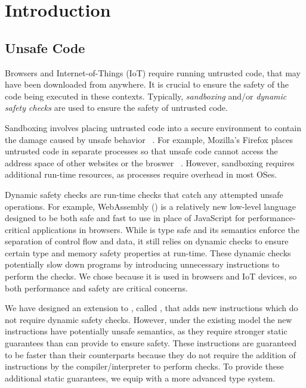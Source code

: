 \chapter{Introduction}
\label{chp:intro}

\section{Unsafe Code}
Browsers and Internet-of-Things (IoT) require running untrusted code, that may have been downloaded from anywhere.
It is crucial to ensure the safety of the code being executed in these contexts.
Typically, \emph{sandboxing} and/or \emph{dynamic safety checks} are used to ensure the safety of untrusted code.

Sandboxing involves placing untrusted code into a secure environment to contain the damage caused by unsafe behavior ~\cite{sandboxes}.
For example, Mozilla's Firefox places untrusted code in separate processes so that unsafe code cannot access the address space of other websites or the broswer ~\cite{foxbox}.
However, sandboxing requires additional run-time resources, as processes require overhead in most OSes.

Dynamic safety checks are run-time checks that catch any attempted unsafe operations.
For example, WebAssembly (\wasm) is a relatively new low-level language designed to be both safe and fast to use in place of JavaScript for performance-critical applications in browsers.
While \wasm is type safe and its semantics enforce the separation of control flow and data, it still relies on dynamic checks to ensure certain type and memory safety properties at run-time.
These dynamic checks potentially slow down programs by introducing unnecessary instructions to perform the checks.
We chose \wasm because it is used in browsers and IoT devices, so both performance and safety are critical concerns.

We have designed an extension to \wasm, called \name, that adds new instructions which do not require dynamic safety checks.
However, under the existing \wasm model the new \name instructions have potentially unsafe semantics, as they require stronger static guarantees than \wasm can provide to ensure safety.
These instructions are guaranteed to be faster than their \wasm counterparts because they do not require the addition of instructions by the compiler/interpreter to perform checks.
To provide these additional static guarantees, we equip \name with a more advanced type system.

